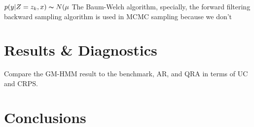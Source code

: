 \documentclass[11pt, letterpaper, journal]{IEEEtran}
\begin{document}
$p(y|Z=z_k, x) \thicksim N(\mu$  The Baum-Welch algorithm, specially, the forward filtering backward sampling algorithm is used in MCMC sampling because we don't 


\section{Results \& Diagnostics}
Compare the GM-HMM result to the benchmark, AR, and QRA in terms of UC and CRPS.

\section{Conclusions}

\printbibliography[heading=bibintoc, title={References}]
\end{document}

